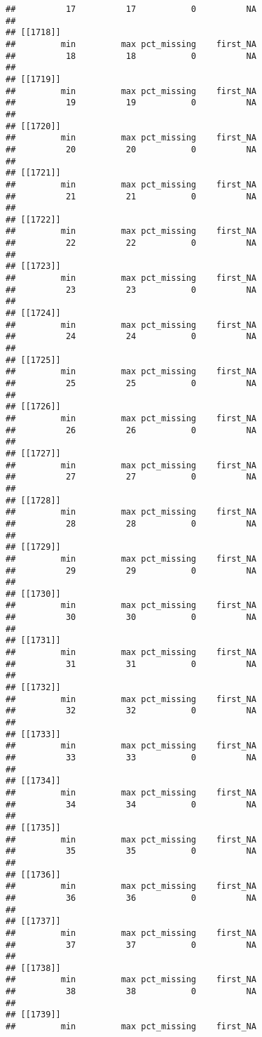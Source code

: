 \documentclass[
]{article}
\begin{document}
\begin{verbatim}
##          17          17           0          NA 
## 
## [[1718]]
##         min         max pct_missing    first_NA 
##          18          18           0          NA 
## 
## [[1719]]
##         min         max pct_missing    first_NA 
##          19          19           0          NA 
## 
## [[1720]]
##         min         max pct_missing    first_NA 
##          20          20           0          NA 
## 
## [[1721]]
##         min         max pct_missing    first_NA 
##          21          21           0          NA 
## 
## [[1722]]
##         min         max pct_missing    first_NA 
##          22          22           0          NA 
## 
## [[1723]]
##         min         max pct_missing    first_NA 
##          23          23           0          NA 
## 
## [[1724]]
##         min         max pct_missing    first_NA 
##          24          24           0          NA 
## 
## [[1725]]
##         min         max pct_missing    first_NA 
##          25          25           0          NA 
## 
## [[1726]]
##         min         max pct_missing    first_NA 
##          26          26           0          NA 
## 
## [[1727]]
##         min         max pct_missing    first_NA 
##          27          27           0          NA 
## 
## [[1728]]
##         min         max pct_missing    first_NA 
##          28          28           0          NA 
## 
## [[1729]]
##         min         max pct_missing    first_NA 
##          29          29           0          NA 
## 
## [[1730]]
##         min         max pct_missing    first_NA 
##          30          30           0          NA 
## 
## [[1731]]
##         min         max pct_missing    first_NA 
##          31          31           0          NA 
## 
## [[1732]]
##         min         max pct_missing    first_NA 
##          32          32           0          NA 
## 
## [[1733]]
##         min         max pct_missing    first_NA 
##          33          33           0          NA 
## 
## [[1734]]
##         min         max pct_missing    first_NA 
##          34          34           0          NA 
## 
## [[1735]]
##         min         max pct_missing    first_NA 
##          35          35           0          NA 
## 
## [[1736]]
##         min         max pct_missing    first_NA 
##          36          36           0          NA 
## 
## [[1737]]
##         min         max pct_missing    first_NA 
##          37          37           0          NA 
## 
## [[1738]]
##         min         max pct_missing    first_NA 
##          38          38           0          NA 
## 
## [[1739]]
##         min         max pct_missing    first_NA 

\end{verbatim}
\end{document}
